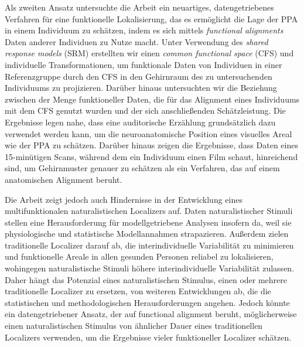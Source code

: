 Als zweiten Ansatz untersuchte die Arbeit ein neuartiges, datengetriebenes
Verfahren für eine funktionelle Lokalisierung, das es ermöglicht die Lage der
PPA in einem Individuum zu schätzen, indem es sich mittels \textit{functional
alignments} Daten anderer Individuen zu Nutze macht.
%
Unter Verwendung des \textit{shared response models} (SRM) erstellten  wir
einen \textit{common functional space} (CFS) und individuelle Transformationen,
um funktionale Daten von Individuen in einer Referenzgruppe durch den CFS in
den Gehirnraum des zu untersuchenden Individuums zu projizieren.
%
Darüber hinaus untersuchten wir die Beziehung zwischen der Menge funktioneller
Daten, die für das Alignment eines Individuums mit dem CFS genutzt wurden und
der sich anschließenden Schätzleistung.
Die Ergebnisse legen nahe, dass eine auditorische Erzählung grundsätzlich dazu
verwendet werden kann, um die neuroanatomische Position eines visuelles Areal
wie der PPA zu schätzen.
%
Darüber hinaus zeigen die Ergebnisse, dass Daten eines 15-minütigen Scans,
während dem ein Individuum einen Film schaut, hinreichend sind, um Gehirnmuster
genauer zu schätzen als ein Verfahren, das auf einem anatomischen Alignment
beruht.

Die Arbeit zeigt jedoch auch Hindernisse in der Entwicklung eines
multifunktionalen naturalistischen Localizers auf.
%
Daten naturalistischer Stimuli stellen eine Herausforderung für
modellgetriebene Analysen insofern da, weil sie physiologische und statistische
Modellannahmen strapazieren.
%
Außerdem zielen traditionelle Localizer darauf ab, die interindividuelle
Variabilität zu minimieren und funktionelle Areale in allen gesunden Personen
reliabel zu lokalisieren, wohingegen naturalistische Stimuli höhere
interindividuelle Variabilität zulassen.
Daher hängt das Potenzial eines naturalistischen Stimulus, einen oder mehrere
traditionelle Localizer zu ersetzen, von weiteren Entwicklungen ab, die die
statistischen und methodologischen Herausforderungen angehen.
%
Jedoch könnte ein datengetriebener Ansatz, der auf functional alignment beruht,
möglicherweise einen naturalistischen Stimulus von ähnlicher Dauer eines
traditionellen Localizers verwenden, um die Ergebnisse vieler funktioneller
Localizer schätzen.
